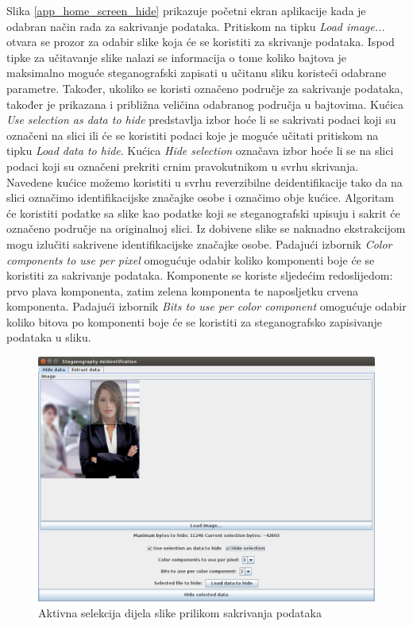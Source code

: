 \documentclass[times, utf8, seminar]{fer}
\begin{document}
Slika \ref{app_home_screen_hide} prikazuje početni ekran aplikacije kada je odabran način rada za sakrivanje podataka. Pritiskom na tipku \textit{Load image...} otvara se prozor za odabir slike koja će se koristiti za skrivanje podataka. Ispod tipke za učitavanje slike nalazi se informacija o tome koliko bajtova je maksimalno moguće steganografski zapisati u učitanu sliku koristeći odabrane parametre. Također, ukoliko se koristi označeno područje za sakrivanje podataka, također je prikazana i približna veličina odabranog područja u bajtovima. Kućica \textit{Use selection as data to hide} predstavlja izbor hoće li se sakrivati podaci koji su označeni na slici ili će se koristiti podaci koje je moguće učitati pritiskom na tipku \textit{Load data to hide}. Kućica \textit{Hide selection} označava izbor hoće li se na slici podaci koji su označeni prekriti crnim pravokutnikom u svrhu skrivanja. Navedene kućice možemo koristiti u svrhu reverzibilne deidentifikacije tako da na slici označimo identifikacijske značajke osobe i označimo obje kućice. Algoritam će koristiti podatke sa slike kao podatke koji se steganografski upisuju i sakrit će označeno područje na originalnoj slici. Iz dobivene slike se naknadno ekstrakcijom mogu izlučiti sakrivene identifikacijske značajke osobe. Padajući izbornik \textit{Color components to use per pixel} omogućuje odabir koliko komponenti boje će se koristiti za sakrivanje podataka. Komponente se koriste sljedećim redoslijedom: prvo plava komponenta, zatim zelena komponenta te naposljetku crvena komponenta. Padajući izbornik \textit{Bits to use per color component} omogućuje odabir koliko bitova po komponenti boje će se koristiti za steganografsko zapisivanje podataka u sliku. 

\begin{figure}[H]
\caption{Aktivna selekcija dijela slike prilikom sakrivanja podataka}
\label{app_selection_active}
\centerline{\includegraphics[scale=0.4]{images/app_selection_active.png}}
\end{figure}
\end{document}
